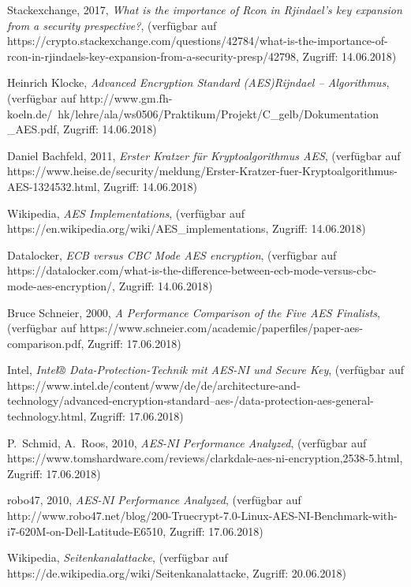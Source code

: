 \documentclass[conference,10pt,a4paper,twocolumn]{IEEEtran}
\begin{document}
\begin{thebibliography}{1}
Stackexchange, 2017, \emph{What is the importance of Rcon in Rjindael's key expansion from a security prespective?}, (verfügbar auf https://crypto.stackexchange.com/questions/42784/what-is-the-importance-of-rcon-in-rjindaels-key-expansion-from-a-security-presp/42798, Zugriff: 14.06.2018)

Heinrich Klocke, \emph{Advanced Encryption Standard (AES)Rijndael – Algorithmus}, (verfügbar auf http://www.gm.fh-koeln.de/~hk/lehre/ala/ws0506/Praktikum/Projekt/C{\_}gelb/Dokumentation
{\_}AES.pdf, Zugriff: 14.06.2018)

Daniel Bachfeld, 2011, \emph{Erster Kratzer für Kryptoalgorithmus AES}, (verfügbar auf https://www.heise.de/security/meldung/Erster-Kratzer-fuer-Kryptoalgorithmus-AES-1324532.html, Zugriff: 14.06.2018)

Wikipedia, \emph{AES Implementations}, (verfügbar auf https://en.wikipedia.org/wiki/AES{\_}implementations, Zugriff: 14.06.2018)

Datalocker, \emph{ECB versus CBC Mode AES encryption}, (verfügbar auf https://datalocker.com/what-is-the-difference-between-ecb-mode-versus-cbc-mode-aes-encryption/, Zugriff: 14.06.2018)

Bruce Schneier, 2000, \emph{A Performance Comparison of the Five AES Finalists}, (verfügbar auf https://www.schneier.com/academic/paperfiles/paper-aes-comparison.pdf, Zugriff: 17.06.2018)

Intel, \emph{Intel® Data-Protection-Technik mit AES-NI und Secure Key}, (verfügbar auf https://www.intel.de/content/www/de/de/architecture-and-technology/advanced-encryption-standard--aes-/data-protection-aes-general-technology.html, Zugriff: 17.06.2018)

P.~Schmid, A.~Roos, 2010, \emph{AES-NI Performance Analyzed}, (verfügbar auf https://www.tomshardware.com/reviews/clarkdale-aes-ni-encryption,2538-5.html, Zugriff: 17.06.2018)

robo47, 2010, \emph{AES-NI Performance Analyzed}, (verfügbar auf http://www.robo47.net/blog/200-Truecrypt-7.0-Linux-AES-NI-Benchmark-with-i7-620M-on-Dell-Latitude-E6510, Zugriff: 17.06.2018)

Wikipedia, \emph{Seitenkanalattacke}, (verfügbar auf https://de.wikipedia.org/wiki/Seitenkanalattacke, Zugriff: 20.06.2018)


\end{thebibliography}
\end{document}
